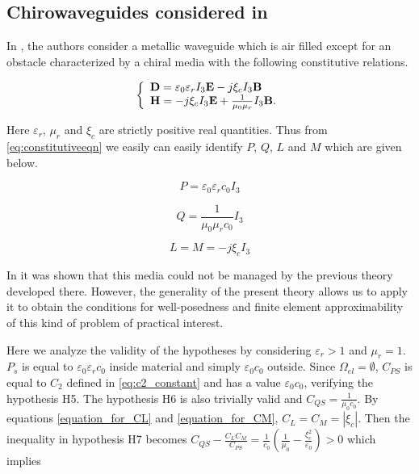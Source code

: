 \subsection{Chirowaveguides considered in \cite{wujaggard}}
In \cite{wujaggard}, the authors consider a metallic waveguide 
which is air filled except for an obstacle
characterized by a chiral media  with the following constitutive relations. 

\begin{equation}
\left\{
\begin{array}{ll}
{\bf D} = \varepsilon_0\varepsilon_r I_3 {\bf E} - j \xi_c I_3 {\bf B} \\
{\bf H} = -j\xi_c I_3 {\bf E} + \frac{1}{\mu_0\mu_r} I_3 {\bf B}.
\end{array}
\right.
\end{equation}

Here $\varepsilon_r$, $\mu_r$ and $\xi_c$ are strictly positive real quantities.
Thus from \eqref{eq:constitutiveeqn} we easily can easily identify $P$, $Q$, $L$
and $M$ which are given below.

\begin{equation} \label{constitutive_wu_P}
P = \varepsilon_0\varepsilon_rc_0 I_3 
\end{equation}

\begin{equation} \label{constitutive_wu_Q}
Q = \frac{1}{\mu_0\mu_rc_0} I_3
\end{equation}

\begin{equation} \label{constitutive_wu_LM}
L = M = -j\xi_cI_3
\end{equation}

In \cite{bianisotropi_m3as} it was shown that this media could not be managed by the previous theory
developed there.
However, the generality of the present theory allows us to apply it to obtain 
the conditions for well-posedness and finite element approximability of this kind 
of problem of practical interest.

Here we analyze the validity of the hypotheses by considering $\varepsilon_r > 1$ 
and $\mu_r =1$.
$P_s$ is equal to $\varepsilon_0 \varepsilon_r c_0$ inside material 
and simply $\varepsilon_0 c_0$ outside.
Since $\Omega_{el} = \emptyset$,  $C_{PS}$ is equal to $C_2$ defined in 
\eqref{eq:c2_constant} and has a value $\varepsilon_0 c_0$, 
verifying the hypothesis H5.
The hypothesis H6 is also trivially valid and $C_{QS} = \frac{1}{\mu_0 c_0}$. 
By equations \eqref{equation_for_CL} and \eqref{equation_for_CM}, $C_L = C_M =  |\xi_c|$.
Then the inequality in hypothesis H7 becomes  
$C_{QS} - \frac{C_L C_M}{C_{PS}} = \frac{1}{c_0}(\frac{1}{\mu_0} - \frac{\xi_c^2}{\varepsilon_0}) > 0$ 
which implies

